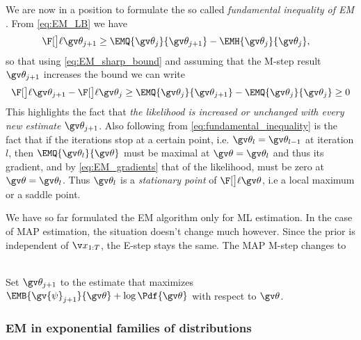We are now in a position to formulate the so called \emph{fundamental inequality of EM} \parencite{Cappe2005}.
From \eqref{eq:EM_LB} we have
\begin{align*}
	\lLH[\Th_{j+1}] & \geq \EMQ{\Th_j}{\Th_{j+1}} - \EMH{\Th_j}{\Th_{j}},
\end{align*}
so that using \eqref{eq:EM_sharp_bound} and assuming that the M-step result $\Th_{j+1}$ increases
the bound we can write
\begin{align}
\label{eq:fundamental_inequality}	
\begin{split}	
	\lLH[\Th_{j+1}] - \lLH[\Th_j] & \geq \EMQ{\Th_j}{\Th_{j+1}} - \EMQ{\Th_j}{\Th_{j}} \geq 0\\
\end{split}
\end{align}
This highlights
the fact that \emph{the likelihood is increased or unchanged with every new estimate} $\Th_{j+1}$.
Also following from \eqref{eq:fundamental_inequality} is the fact that if the iterations
stop at a certain point, i.e. $\Th_{l}=\Th_{l-1}$ at iteration $l$, then
$\EMQ{\Th_l}{\Th}$ must be maximal at $\Th=\Th_l$ and thus its gradient, and 
by \eqref{eq:EM_gradients} that of the likelihood, must be zero at $\Th=\Th_l$. Thus
$\Th_l$ is a \emph{stationary point} of $\lLH$, i.e a local maximum or a saddle point.

We have so far formulated the EM algorithm only for ML estimation. In the case
of MAP estimation, the situation doesn't change much however. Since the prior
is independent of $\X$, the E-step stays the same. The MAP M-step changes to
\begin{description}
\addtolength{\leftskip}{1cm}
  \item[M-step (MAP)]\hfill\\ 
  Set $\Th_{j+1}$ to the estimate that maximizes $\EMB{\gv{\psi}_{j+1}}{\Th}+\log\Pdf{\Th}$ with respect to $\Th$.
\end{description}%


 

\subsubsection*{EM in exponential families of distributions}\label{sec:EM_exp}%

